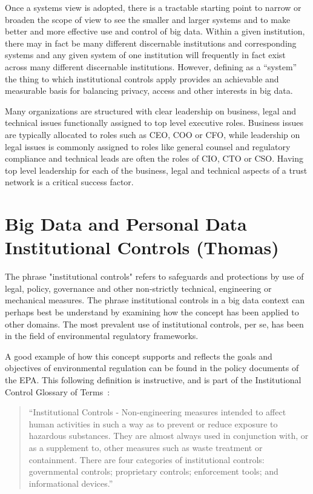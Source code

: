 Once a systems view is adopted, there is a tractable starting point to narrow or broaden the scope of view to see the smaller and larger systems and to make better and more effective use and control of big data.
Within a given institution, there may in fact be many different discernable institutions and corresponding systems and any given system of one institution will frequently in fact exist across many different discernable institutions. 
However, defining as a “system” the thing to which institutional controls apply provides an achievable and measurable basis for balancing privacy, access and other interests in big data.

Many organizations are structured with clear leadership on business, legal and technical issues functionally assigned to top level executive roles.  Business issues are typically allocated to roles such as CEO, COO or CFO, while leadership on legal issues is commonly assigned to roles like general counsel and regulatory compliance and technical leads are often the roles of CIO, CTO or CSO.  Having top level leadership for each of the business, legal and technical aspects of a trust network is a critical success factor. 


\section{Big Data and Personal Data Institutional Controls (Thomas)}

The phrase "institutional controls" refers to safeguards and protections by use of legal, policy, governance and other non-strictly technical, engineering or mechanical measures.
The phrase institutional controls in a big data context can perhaps best be understand by examining how the concept has been applied to other domains.
The most prevalent use of institutional controls, per se, has been in the field of environmental regulatory frameworks.

A good example of how this concept supports and reflects the goals and objectives of environmental regulation can be found in the policy documents of the EPA.
This following definition is instructive, and is part of the Institutional Control Glossary of Terms~\cite{EPA2007}:
\begin{quote}
``Institutional Controls - Non-engineering measures intended to affect human activities in such a way as to prevent or reduce exposure to hazardous substances. They are almost always used in conjunction with, or as a supplement to, other measures such as waste treatment or containment. There are four categories of institutional controls: governmental controls; proprietary controls; enforcement tools; and informational devices.''
\end{quote}

